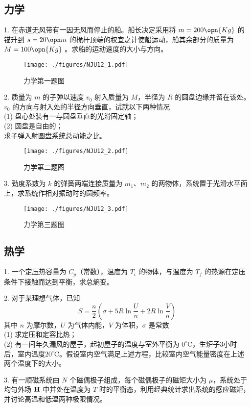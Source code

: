 \subsection{力学}
1. 在赤道无风带有一因无风而停止的船。船长决定采用将 $m=200\opn{Kg}$ 的锚升到 $s=20\opn m$ 的桅杆顶端的权宜之计使船运动，船其余部分的质量为 $M=100 \opn{Kg}$ 。求船的运动速度的大小与方向。
\begin{figure}[ht]
\centering
\texttt{[image: ./figures/NJU12\_1.pdf]}
\caption{力学第一题图} \label{NJU12_fig1}
\end{figure}
2. 质量为 $m$ 的子弹以速度 $v_0$ 射入质量为 $M$，半径为 $R$ 的圆盘边缘并留在该处。$v_0$ 的方向与射入处的半径方向垂直，试就以下两种情况\\
(1) 盘心处装有一与圆盘垂直的光滑固定轴；\\
(2) 圆盘是自由的；\\
求子弹入射圆盘系统总动能之比。
\begin{figure}[ht]
\centering
\texttt{[image: ./figures/NJU12\_2.pdf]}
\caption{力学第二题图} \label{NJU12_fig2}
\end{figure}
3. 劲度系数为 $k$ 的弹簧两端连接质量为 $m_1$、$m_2$ 的两物体，系统置于光滑水平面上，求系统作相对振动时的圆频率。
\begin{figure}[ht]
\centering
\texttt{[image: ./figures/NJU12\_3.pdf]}
\caption{力学第三题图} \label{NJU12_fig3}
\end{figure}
\subsection{热学}
1. 一个定压热容量为 $C_p$（常数），温度为 $T_i$ 的物体，与温度为 $T_f$ 的热源在定压条件下接触而达到平衡，求总熵变。

2. 对于某理想气体，已知
\begin{equation}
S=\frac n2 (\sigma+5R\ln{\frac Un}+2R\ln{\frac Vn})
\end{equation}
其中 $n$ 为摩尔数，$U$ 为气体内能，$V$ 为体积，$\sigma$ 是常数\\
(1) 求定压和定容比热；\\
(2) 有一间年久漏风的屋子，起初屋子的温度与室外平衡为 $0^\circ\mathrm{C}$，生炉子3小时后，室内温度$20^\circ\mathrm{C}$。假设室内空气满足上述方程，比较室内空气能量密度在上述两个温度下的大小。

3. 有一顺磁系统由 $N$ 个磁偶极子组成，每个磁偶极子的磁矩大小为 $\mu$，系统处于均匀外场 $\bf H$ 中并处在温度为 $T$ 时的平衡态，利用经典统计求出系统的感应磁矩，并讨论高温和低温两种极限情况。
